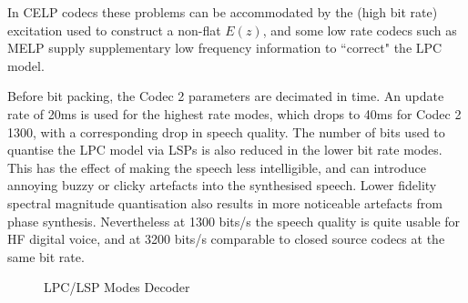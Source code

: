 \documentclass{article}
\begin{document}
In CELP codecs these problems can be accommodated by the (high bit rate) excitation used to construct a non-flat $E(z)$, and some low rate codecs such as MELP supply supplementary low frequency information to ``correct" the LPC model.

Before bit packing, the Codec 2 parameters are decimated in time.  An update rate of 20ms is used for the highest rate modes, which drops to 40ms for Codec 2 1300, with a corresponding drop in speech quality.  The number of bits used to quantise the LPC model via LSPs is also reduced in the lower bit rate modes.  This has the effect of making the speech less intelligible, and can introduce annoying buzzy or clicky artefacts into the synthesised speech.  Lower fidelity spectral magnitude quantisation also results in more noticeable artefacts from phase synthesis.  Nevertheless at 1300 bits/s the speech quality is quite usable for HF digital voice, and at 3200 bits/s comparable to closed source codecs at the same bit rate.

\begin{figure}[H]
\caption{LPC/LSP Modes Decoder}
\label{fig:decoder_lpc_lsp}
\begin{center}
\end{center}
\end{figure}
\end{document}
